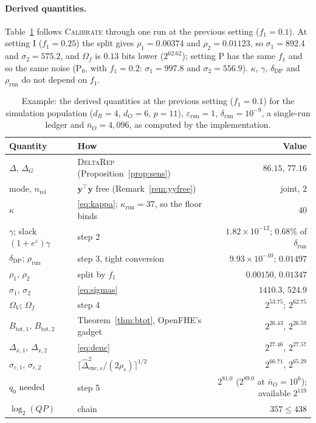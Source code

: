 \documentclass[11pt]{article}
\theoremstyle{definition}
\theoremstyle{plain}
\newcommand{\by}{\mathbf{y}}
\begin{document}
\paragraph{Derived quantities.} Table~\ref{tab:derived} follows \textsc{Calibrate} through one run at the previous setting ($f_1 = 0.1$). At setting I ($f_1 = 0.25$) the split gives $\rho_1 = 0.00374$ and $\rho_2 = 0.01123$, so $\sigma_1 = 892.4$ and $\sigma_2 = 575.2$, and $\Omega_f$ is $0.13$ bits lower ($2^{62.62}$); setting P has the same $f_1$ and so the same noise (P$_0$, with $f_1 = 0.2$: $\sigma_1 = 997.8$ and $\sigma_2 = 556.9$). $\kappa$, $\gamma$, $\delta_{\mathrm{DP}}$ and $\rho_{\mathrm{run}}$ do not depend on $f_1$.

\begin{table}[ht]
\centering\small
\caption{Example: the derived quantities at the previous setting ($f_1 = 0.1$) for the simulation population ($d_R = 4$, $d_O = 6$, $p = 11$), $\varepsilon_{\mathrm{run}} = 1$, $\delta_{\mathrm{run}} = 10^{-9}$, a single-run ledger and $\bar n_O = 4{,}096$, as computed by the implementation.}
\label{tab:derived}
\begin{tabular}{@{}llr@{}}
\toprule
Quantity & How & Value \\
\midrule
$\Delta$, $\Delta_G$ & \textsc{DeltaRep} (Proposition~\ref{prop:sens}) & $86.15$, $77.16$ \\
mode, $n_{\mathrm{rel}}$ & $\by^\top\by$ free (Remark~\ref{rem:yyfree}) & joint, $2$ \\
$\kappa$ & \eqref{eq:kappa}; $\kappa_{\mathrm{run}} = 37$, so the floor binds & $40$ \\
$\gamma$; slack $(1 + e^{\varepsilon})\gamma$ & step 2 & $1.82 \times 10^{-12}$; $0.68\%$ of $\delta_{\mathrm{run}}$ \\
$\delta_{\mathrm{DP}}$; $\rho_{\mathrm{run}}$ & step 3, tight conversion & $9.93 \times 10^{-10}$; $0.01497$ \\
$\rho_1$, $\rho_2$ & split by $f_1$ & $0.00150$, $0.01347$ \\
$\sigma_1$, $\sigma_2$ & \eqref{eq:sigmas} & $1410.3$, $524.9$ \\
$\Omega_V$; $\Omega_f$ & step 4 & $2^{53.75}$; $2^{62.75}$ \\
$B_{\mathrm{tot},1}$, $B_{\mathrm{tot},2}$ & Theorem~\ref{thm:btot}, OpenFHE's gadget & $2^{26.43}$, $2^{26.59}$ \\
$\Delta_{x,1}$, $\Delta_{x,2}$ & \eqref{eq:denc} & $2^{27.46}$, $2^{27.57}$ \\
$\sigma_{c,1}$, $\sigma_{c,2}$ & $\lceil\widehat\Delta_{\mathrm{enc},s}^2/(2\rho_s)\rceil^{1/2}$ & $2^{66.71}$, $2^{65.29}$ \\
$q_0$ needed & step 5 & $2^{81.0}$ ($2^{89.0}$ at $\bar n_O = 10^6$); available $2^{119}$ \\
$\log_2(QP)$ & chain & $357 \le 438$ \\
\bottomrule
\end{tabular}
\end{table}
\end{document}
